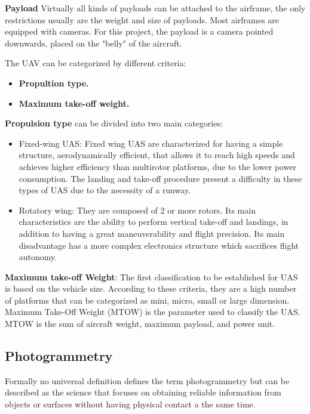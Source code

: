 \textbf{Payload} Virtually all kinds of payloads can be attached to the airframe, the only restrictions usually are the weight and size of payloads. Most airframes are equipped with cameras. For this project, the payload is a camera pointed downwards, placed on the "belly" of the aircraft. 

The UAV can be categorized by different criteria: 
\begin{itemize}
    \item \textbf{Propultion type.}
    \item  \textbf{Maximum take-off weight.}
\end{itemize}
\textbf{Propulsion type} can be divided into two main categories:
\begin{itemize}
\item Fixed-wing UAS: Fixed wing UAS are characterized for having a simple structure, aerodynamically efficient, that allows it to reach high speeds and achieves higher efficiency than multirotor platforms, due to the lower power consumption. The landing and take-off procedure present a difficulty in these types of UAS due to the necessity of a runway.
\item Rotatory wing: They are composed of 2 or more rotors. Its main characteristics are the ability to perform vertical take-off and landings, in addition to having a great maneuverability and flight precision. Its main disadvantage has a more complex electronics structure which sacrifices flight autonomy.\cite{Luis_Fernadno}
\end{itemize}

\textbf{Maximum take-off Weight}: The first classification to be established for UAS is based on the vehicle size. According to these criteria, they are a high number of platforms that can be categorized as mini, micro, small or large dimension. Maximum Take-Off Weight (MTOW) is the parameter used to classify the UAS. MTOW is the sum of aircraft weight, maximum payload, and power unit.\cite{ICAO}

\subsection{Photogrammetry}
Formally no universal definition defines the term photogrammetry but  can be described as the science that focuses on obtaining  reliable information from objects or surfaces without having physical contact a the same time.\cite{Fotogrametria_digital}

